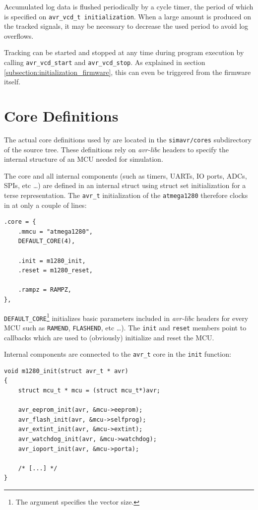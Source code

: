 Accumulated log data is flushed periodically by a cycle timer, the period of
which is specified on \lstinline|avr_vcd_t initialization|. When a large amount
is produced on the tracked signals, it may be necessary to decrease the used
period to avoid log overflows.

Tracking can be started and stopped at any time during program execution by
calling \lstinline|avr_vcd_start| and \lstinline|avr_vcd_stop|. As explained in
section \ref{subsection:initialization_firmware}, this can even be triggered from the
firmware itself.


\section{Core Definitions}

The actual core definitions used by \simavr are located in the
\verb|simavr/cores| subdirectory of the source tree. These definitions rely on
\emph{avr-libc} headers to specify the internal structure of an \ac{MCU} needed
for simulation.

The core and all internal components (such as timers, \acp{UART}, \ac{IO} ports,
\acp{ADC}, \acp{SPI}, etc \ldots) are defined in an internal struct using struct
set initialization for a terse representation. The \lstinline|avr_t| initialization
of the \verb|atmega1280| therefore clocks in at only a couple of lines:

\begin{lstlisting}
.core = {
    .mmcu = "atmega1280",
    DEFAULT_CORE(4),

    .init = m1280_init,
    .reset = m1280_reset,

    .rampz = RAMPZ,
},
\end{lstlisting}

\lstinline|DEFAULT_CORE|\footnote{
%
The argument specifies the vector size.
%
} initializes basic parameters included in \emph{avr-libc}
headers for every \ac{MCU} such as \lstinline|RAMEND|, \lstinline|FLASHEND|,
etc \ldots). The \lstinline|init| and \lstinline|reset| members point to callbacks
which are used to (obviously) initialize and reset the \ac{MCU}.

Internal components are connected to the \lstinline|avr_t| core in the
\lstinline|init| function:

\begin{lstlisting}
void m1280_init(struct avr_t * avr)
{
    struct mcu_t * mcu = (struct mcu_t*)avr;

    avr_eeprom_init(avr, &mcu->eeprom);
    avr_flash_init(avr, &mcu->selfprog);
    avr_extint_init(avr, &mcu->extint);
    avr_watchdog_init(avr, &mcu->watchdog);
    avr_ioport_init(avr, &mcu->porta);

    /* [...] */
}
\end{lstlisting}

